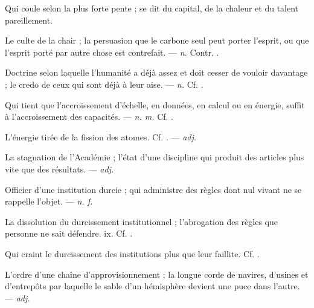  Qui coule selon la plus forte pente ; se dit du capital, de la chaleur et du talent pareillement.

 Le culte de la chair ; la persuasion que le carbone seul peut porter l'esprit, ou que l'esprit porté par autre chose est contrefait. ---  \textit{n.} Contr. .

 Doctrine selon laquelle l'humanité a déjà assez et doit cesser de vouloir davantage ; le credo de ceux qui sont déjà à leur aise. ---  \textit{n.} Cf. .

 Qui tient que l'accroissement d'échelle, en données, en calcul ou en énergie, suffit à l'accroissement des capacités. ---  \textit{n. m.} Cf. .

 L'énergie tirée de la fission des atomes. Cf. . ---  \textit{adj.}

 La stagnation de l'Académie ; l'état d'une discipline qui produit des articles plus vite que des résultats. ---  \textit{adj.}

 Officier d'une institution durcie ; qui administre des règles dont nul vivant ne se rappelle l'objet. ---  \textit{n. f.}

 La dissolution du durcissement institutionnel ; l'abrogation des règles que personne ne sait défendre.   ix. Cf. .

 Qui craint le durcissement des institutions plus que leur faillite. Cf. .

 L'ordre d'une chaîne d'approvisionnement ; la longue corde de navires, d'usines et d'entrepôts par laquelle le sable d'un hémisphère devient une puce dans l'autre. ---  \textit{adj.}

